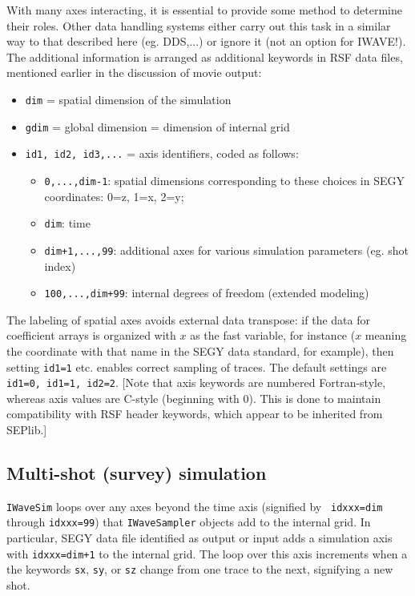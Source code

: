 With many axes interacting, it is essential to provide some method to
determine their roles. Other data handling systems either carry out
this task in a similar way to that described here (eg. DDS,...) or
ignore it (not an option for IWAVE!). The additional information is
arranged as additional keywords in RSF data files, mentioned earlier
in the discussion of movie output:
\begin{itemize}
\item {\tt dim} = spatial dimension of the simulation
\item {\tt gdim} = global dimension = dimension of internal grid
\item {\tt id1, id2, id3,...} = axis identifiers, coded as follows:
\begin{itemize}
\item {\tt 0,...,dim-1}: spatial dimensions corresponding to these
  choices in SEGY coordinates: 0=z, 1=x, 2=y;
\item{\tt dim}: time
\item{\tt dim+1,...,99}: additional axes for various simulation
  parameters (eg. shot index)
\item{\tt 100,...,dim+99}: internal degrees of freedom (extended
  modeling)
\end{itemize}
\end{itemize}
The labeling of spatial axes avoids external data transpose: if the
data for coefficient arrays is organized with $x$ as the fast
variable, for instance ($x$ meaning the coordinate with that name in
the SEGY data standard, for example), then setting {\tt id1=1}
etc. enables correct sampling of traces. The default settings are {\tt
  id1=0, id1=1, id2=2}. [Note that axis keywords are numbered
Fortran-style, whereas axis values are C-style (beginning with
0). This is done to maintain compatibility with RSF header keywords,
which appear to be inherited from SEPlib.]

\subsection{Multi-shot (survey) simulation}

{\tt IWaveSim} loops over any axes beyond the time axis (signified by {\tt
  idxxx=dim} through {\tt idxxx=99}) that {\tt IWaveSampler} objects 
add to the internal grid. In particular, SEGY data file identified as output or
input adds a simulation axis with {\tt idxxx=dim+1} to the internal
grid. The loop over this axis increments when a the keywords {\tt sx},
{\tt sy}, or {\tt sz} change from one trace to the next, signifying a
new shot.

